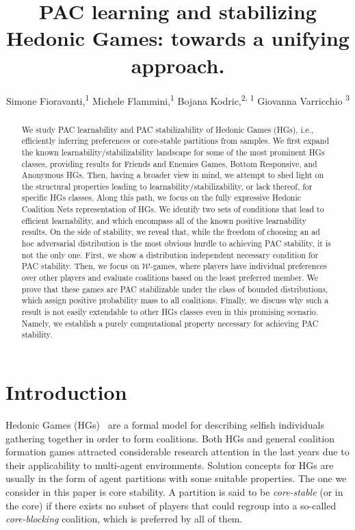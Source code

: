 \documentclass[letterpaper]{article} %
\title{PAC learning and stabilizing Hedonic Games: towards a unifying approach.}
\author {
    Simone Fioravanti,\textsuperscript{\rm 1}
    Michele Flammini,\textsuperscript{\rm 1}
    Bojana Kodric,\textsuperscript{\rm 2, \rm 1}
    Giovanna Varricchio \textsuperscript{\rm 3}
}
\newcommand{\W}{\ensuremath{\mathcal{W}}}
\begin{document}
\maketitle

\begin{abstract}
We study PAC learnability and PAC stabilizability of Hedonic Games (HGs), i.e., efficiently inferring preferences or core-stable partitions from samples.
 We first expand the known learnability/stabilizability landscape for some of the most prominent HGs classes, providing results for Friends and Enemies Games, Bottom Responsive, and Anonymous HGs. 
 Then, having a broader view in mind, we attempt to shed light on the structural properties leading to learnability/stabilizability, or lack thereof, for specific HGs classes.
 Along this path, we focus on the fully expressive Hedonic Coalition Nets representation of HGs. We identify two sets of conditions that lead to efficient learnability, and which encompass all of the known positive learnability results.
 On the side of stability, we reveal that, while the freedom of choosing an ad hoc adversarial distribution is the most obvious hurdle to achieving PAC stability, it is not the only one. First, we show a distribution independent necessary condition for PAC stability.
%
Then, we focus on $\W$-games, where players have individual preferences over other players and evaluate coalitions based on the least preferred member.
%
We prove that these games are PAC stabilizable under the class of bounded distributions, which assign positive probability mass to all coalitions.
Finally, we discuss why such a result is not easily extendable to other HGs classes even in this promising scenario. Namely, we establish a purely computational property necessary for achieving PAC stability.
\end{abstract}

\section{Introduction}
Hedonic Games (HGs)~\cite{Dreze80} are a formal model for describing selfish individuals gathering together in order to form coalitions. Both HGs and general coalition formation games attracted considerable research attention in the last years due to their applicability to multi-agent environments.
Solution concepts for HGs are usually in the form of agent partitions with some suitable properties. The one we consider in this paper is core stability. A partition is said to be \emph{core-stable} (or in the core) if there exists no subset of players that could regroup into a so-called \emph{core-blocking} coalition, which is preferred by all of them.
\end{document}
